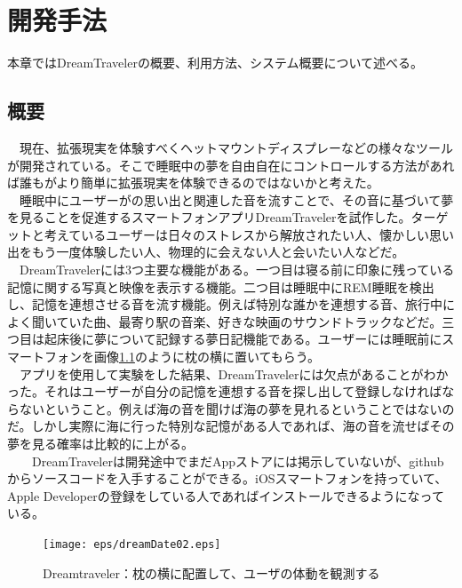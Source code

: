 \chapter{開発手法}
\label{chap:coding}

本章ではDreamTravelerの概要、利用方法、システム概要について述べる。

\section{概要}
　現在、拡張現実を体験すべくヘットマウントディスプレーなどの様々なツールが開発されている。そこで睡眠中の夢を自由自在にコントロールする方法があれば誰もがより簡単に拡張現実を体験できるのではないかと考えた。\\
　睡眠中にユーザーがの思い出と関連した音を流すことで、その音に基づいて夢を見ることを促進するスマートフォンアプリDreamTravelerを試作した。ターゲットと考えているユーザーは日々のストレスから解放されたい人、懐かしい思い出をもう一度体験したい人、物理的に会えない人と会いたい人などだ。\\
　DreamTravelerには3つ主要な機能がある。一つ目は寝る前に印象に残っている記憶に関する写真と映像を表示する機能。二つ目は睡眠中にREM睡眠を検出し、記憶を連想させる音を流す機能。例えば特別な誰かを連想する音、旅行中によく聞いていた曲、最寄り駅の音楽、好きな映画のサウンドトラックなどだ。三つ目は起床後に夢について記録する夢日記機能である。ユーザーには睡眠前にスマートフォンを画像\ref{DreamtravelerImage}のように枕の横に置いてもらう。\\
　アプリを使用して実験をした結果、DreamTravelerには欠点があることがわかった。それはユーザーが自分の記憶を連想する音を探し出して登録しなければならないということ。例えば海の音を聞けば海の夢を見れるということではないのだ。しかし実際に海に行った特別な記憶がある人であれば、海の音を流せばその夢を見る確率は比較的に上がる。\\
　　DreamTravelerは開発途中でまだAppストアには掲示していないが、githubからソースコードを入手することができる。iOSスマートフォンを持っていて、Apple Developerの登録をしている人であればインストールできるようになっている。

\begin{figure}[htbp]
\begin{center}
\texttt{[image: eps/dreamDate02.eps]}
\caption{Dreamtraveler：枕の横に配置して、ユーザの体動を観測する}
\label{DreamtravelerImage}
\end{center}
\end{figure}

